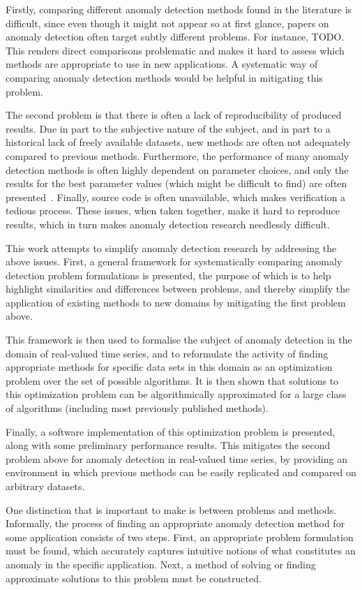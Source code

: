 Firstly, comparing different anomaly detection methods found in the literature is difficult, since even though it might not appear so at first glance, papers on anomaly detection often target subtly different problems. For instance, TODO. This renders direct comparisons problematic and makes it hard to assess which methods are appropriate to use in new applications. A systematic way of comparing anomaly detection methods would be helpful in mitigating this problem.

The second problem is that there is often a lack of reproducibility of produced results. Due in part to the subjective nature of the subject, and in part to a historical lack of freely available datasets, new methods are often not adequately compared to previous methods. Furthermore, the performance of many anomaly detection methods is often highly dependent on parameter choices, and only the results for the best parameter values (which might be difficult to find) are often presented~\cite{keogh5}. Finally, source code is often unavailable, which makes verification a tedious process. These issues, when taken together, make it hard to reproduce results, which in turn makes anomaly detection research needlessly difficult.

This work attempts to simplify anomaly detection research by addressing the above issues. First, a general framework for systematically comparing anomaly detection problem formulations is presented, the purpose of which is to help highlight similarities and differences between problems, and thereby simplify the application of existing methods to new domains by mitigating the first problem above.

This framework is then used to formalise the subject of anomaly detection in the domain of real-valued time series, and to reformulate the activity of finding appropriate methods for specific data sets in this domain as an optimization problem over the set of possible algorithms. It is then shown that solutions to this optimization problem can be algorithmically approximated for a large class of algorithms (including most previously published methods).

Finally, a software implementation of this optimization problem is presented, along with some preliminary performance results. This mitigates the second problem above for anomaly detection in real-valued time series, by providing an environment in which previous methods can be easily replicated and compared on arbitrary datasets.

One distinction that is important to make is between problems and methods. Informally, the process of finding an appropriate anomaly detection method for some application consists of two steps. First, an appropriate problem formulation must be found, which accurately captures intuitive notions of what constitutes an anomaly in the specific application. Next, a method of solving or finding approximate solutions to this problem must be constructed.

